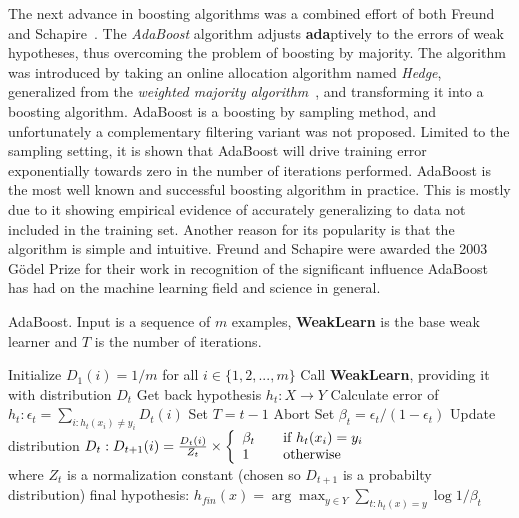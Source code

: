 The next advance in boosting algorithms was a combined effort of both Freund and Schapire~\cite{adaboost}. The {\em AdaBoost} algorithm adjusts {\bf ada}ptively to the errors of weak hypotheses, thus overcoming the problem of boosting by majority. The algorithm was introduced by taking an online allocation algorithm named {\em Hedge}, generalized from the {\em weighted majority algorithm}~\cite{wma}, and transforming it into a boosting algorithm. AdaBoost is a boosting by sampling method, and unfortunately a complementary filtering variant was not proposed. Limited to the sampling setting, it is shown that AdaBoost will drive training error exponentially towards zero in the number of iterations performed. AdaBoost is the most well known and successful boosting algorithm in practice. This is mostly due to it showing empirical evidence of accurately generalizing to data not included in the training set. Another reason for its popularity is that the algorithm is simple and intuitive. Freund and Schapire were awarded the 2003 G\"odel Prize for their work in recognition of the significant influence AdaBoost has had on the machine learning field and science in general.

\begin{algorithm}
\caption{AdaBoost. Input is a sequence of $m$ examples, {\bf WeakLearn} is the base weak learner and $T$ is the number of iterations.}
\begin{algorithmic}[1]
\STATE Initialize $D_{1}(i) = 1/m$ for all $i \in \{1,2,...,m\}$
\STATE Call {\bf WeakLearn}, providing it with distribution $D_{t}$
\STATE Get back hypothesis $h_{t} : X \to Y$
\STATE Calculate error of $h_{t}: \epsilon_{t} = \sum_{i:h_{t}(x_{i}) \ne y_{i}} D_{t}(i)$
\STATE Set $T = t - 1$
\STATE Abort
\ENDIF
\STATE Set $\beta_{t} = \epsilon_{t} / (1 - \epsilon_{t})$
\STATE Update distribution $D_{t}: D_{t+1}(i) = \frac{D_{t}(i)}{Z_{t}} \times \left\{
\begin{array}{l l}
  \beta_{t} & \quad \mbox{if $h_{t}(x_{i}) = y_{i}$}\\
  1 & \quad \mbox{otherwise}\\
\end{array} \right.$
\\ where $Z_{t}$ is a normalization constant (chosen so $D_{t+1}$ is a probabilty distribution)
\ENDFOR
\RETURN final hypothesis: $h_{fin}(x) = \arg \max_{y \in Y} \sum_{t:h_{t}(x)=y} \log 1 / \beta_{t}$
\end{algorithmic}
\label{alg:adaboost}
\end{algorithm}

